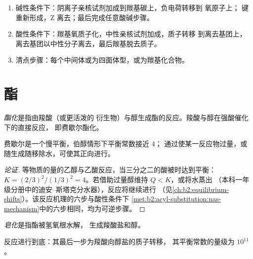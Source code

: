 \begin{method}[画出酰基取代的机理]\label{met:b2:acyl-substitution:nas-mechanism}
\begin{enumerate}
  \item 碱性条件下：阴离子亲核试剂加成到羰基碳上，负电荷转移到
        氧原子上； 键重新形成，Z 离去；最后完成任意酸碱步骤。
  \item 酸性条件下：羰基氧质子化，中性亲核试剂加成，质子转移
        到离去基团上，离去基团以中性分子离去，最后羰基脱去质子。
  \item 清点步骤：每个中间体或为四面体型，或为羰基化合物。
\end{enumerate}
\end{method}

\section{酯}

\begin{definition}[酯化]\label{def:b2:acyl-substitution:esterification}
\emph{酯化}是指由羧酸（或更活泼的
衍生物）与醇生成酯的反应。羧酸与醇在强酸催化下的直接反应，
即费歇尔酯化。
\end{definition}

\begin{proposition}[费歇尔酯化]\label{prop:b2:acyl-substitution:fischer}
费歇尔是一个慢平衡，伯醇情形下平衡常数接近 4；
通过使某一反应物过量，或随生成随移除水，可使其正向进行。
\end{proposition}

\begin{proof}[论证]
等物质的量的乙醇与乙酸反应，当三分之二的酸被时达到平衡：$K =
(2/3)^2/(1/3)^2 = 4$。若借助过量醇维持 $Q < K$，或将水蒸出
（本科一年级分册中的迪安–斯塔克分水器），反应将继续进行
（见\cref{ch:b2:equilibrium-shifts}）。该反应机理的六步与酸性条件下
\cref{met:b2:acyl-substitution:nas-mechanism}中的六步相同，均为可逆步骤。
\end{proof}

\begin{definition}[皂化]\label{def:b2:acyl-substitution:saponification}
\emph{皂化}是指酯被氢氧根水解，
生成羧酸盐和醇。
\end{definition}

\begin{proposition}[皂化反应进行到底]\label{prop:b2:acyl-substitution:saponification}
反应进行到底：其最后一步为羧酸向醇盐的质子转移，
其平衡常数的量级为 $10^{11}$。
\end{proposition}

